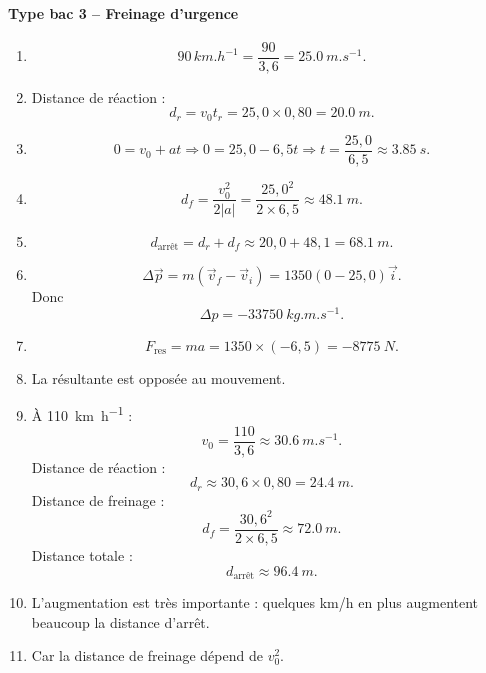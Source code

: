 \documentclass[11pt,a4paper]{article}
\theoremstyle{definition}
\begin{document}
\paragraph{Type bac 3 -- Freinage d’urgence}
\begin{enumerate}[label=\arabic*.]
    \item
    \[
    90\,\si{km.h^{-1}} = \frac{90}{3,6}=\SI{25,0}{m.s^{-1}}.
    \]
    \item Distance de réaction :
    \[
    d_r=v_0t_r=25,0\times0,80=\SI{20,0}{m}.
    \]
    \item
    \[
    0=v_0+at \Rightarrow 0=25,0-6,5t
    \Rightarrow t=\frac{25,0}{6,5}\approx \SI{3,85}{s}.
    \]
    \item
    \[
    d_f=\frac{v_0^2}{2|a|}=\frac{25,0^2}{2\times 6,5}\approx \SI{48,1}{m}.
    \]
    \item
    \[
    d_{\text{arrêt}}=d_r+d_f\approx 20,0+48,1=\SI{68,1}{m}.
    \]
    \item
    \[
    \Delta \vec p = m(\vec v_f-\vec v_i)=1350(0-25,0)\vec i.
    \]
    Donc
    \[
    \Delta p = \SI{-33750}{kg.m.s^{-1}}.
    \]
    \item
    \[
    F_{\text{res}}=ma=1350\times(-6,5)=\SI{-8775}{N}.
    \]
    \item La résultante est opposée au mouvement.
    \item À \SI{110}{km.h^{-1}} :
    \[
    v_0=\frac{110}{3,6}\approx \SI{30,6}{m.s^{-1}}.
    \]
    Distance de réaction :
    \[
    d_r\approx 30,6\times0,80=\SI{24,4}{m}.
    \]
    Distance de freinage :
    \[
    d_f=\frac{30,6^2}{2\times6,5}\approx \SI{72,0}{m}.
    \]
    Distance totale :
    \[
    d_{\text{arrêt}}\approx \SI{96,4}{m}.
    \]
    \item L’augmentation est très importante : quelques km/h en plus augmentent beaucoup la distance d’arrêt.
    \item Car la distance de freinage dépend de $v_0^2$.
\end{enumerate}
\end{document}
